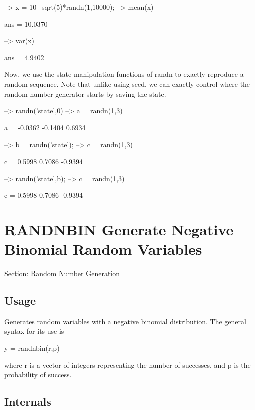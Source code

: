\begin{DoxyVerbInclude}
--> x = 10+sqrt(5)*randn(1,10000);
--> mean(x)

ans = 
   10.0370 

--> var(x)

ans = 
    4.9402 
\end{DoxyVerbInclude}


Now, we use the state manipulation functions of {\ttfamily randn} to exactly reproduce a random sequence. Note that unlike using {\ttfamily seed}, we can exactly control where the random number generator starts by saving the state.


\begin{DoxyVerbInclude}
--> randn('state',0)    %
--> a = randn(1,3)      %

a = 
   -0.0362   -0.1404    0.6934 

--> b = randn('state'); %
--> c = randn(1,3)      %

c = 
    0.5998    0.7086   -0.9394 

--> randn('state',b);   %
--> c = randn(1,3)      %

c = 
    0.5998    0.7086   -0.9394 
\end{DoxyVerbInclude}
 \hypertarget{random_randnbin}{}\section{R\-A\-N\-D\-N\-B\-I\-N Generate Negative Binomial Random Variables}\label{random_randnbin}
Section\-: \hyperlink{sec_random}{Random Number Generation} \hypertarget{vtkwidgets_vtkxyplotwidget_Usage}{}\subsection{Usage}\label{vtkwidgets_vtkxyplotwidget_Usage}
Generates random variables with a negative binomial distribution. The general syntax for its use is \begin{DoxyVerb}   y = randnbin(r,p)
\end{DoxyVerb}
 where {\ttfamily r} is a vector of integers representing the number of successes, and {\ttfamily p} is the probability of success. \hypertarget{transforms_svd_Function}{}\subsection{Internals}\label{transforms_svd_Function}
